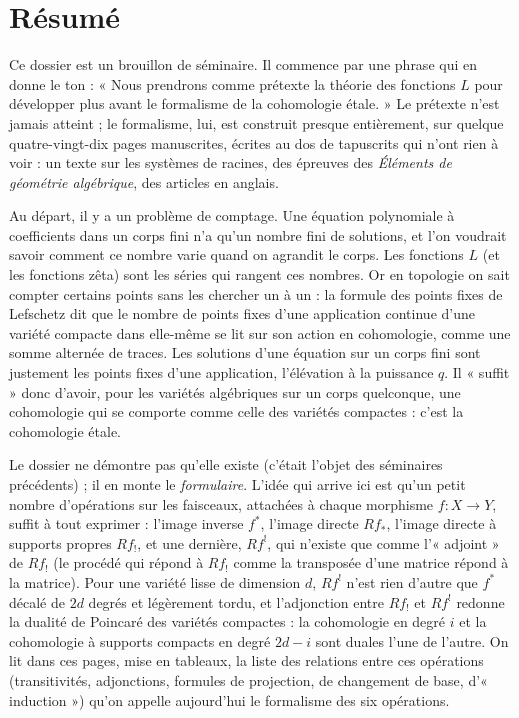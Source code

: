 \documentclass[11pt,a4paper]{article}
\begin{document}
\section*{Résumé}

\begin{resume}
Ce dossier est un brouillon de séminaire. Il commence par une phrase qui en
donne le ton : « Nous prendrons comme prétexte la théorie des fonctions $L$
pour développer plus avant le formalisme de la cohomologie étale. » Le
prétexte n'est jamais atteint ; le formalisme, lui, est construit presque
entièrement, sur quelque quatre-vingt-dix pages manuscrites, écrites au dos de
tapuscrits qui n'ont rien à voir : un texte sur les systèmes de racines, des épreuves des
\emph{Éléments de géométrie algébrique}, des articles en anglais.

Au départ, il y a un problème de comptage. Une équation polynomiale
à coefficients dans un corps fini n'a qu'un nombre fini de solutions, et l'on
voudrait savoir comment ce nombre varie quand on agrandit le corps. Les
fonctions $L$ (et les fonctions zêta) sont les séries qui rangent ces nombres.
Or en topologie on sait compter certains points sans les chercher un à un : la
formule des points fixes de Lefschetz dit que le nombre de points fixes d'une
application continue d'une variété compacte dans elle-même se lit sur son
action en cohomologie, comme une somme alternée de traces. Les solutions d'une
équation sur un corps fini sont justement les points fixes d'une application,
l'élévation à la puissance $q$. Il « suffit » donc d'avoir, pour les variétés
algébriques sur un corps quelconque, une cohomologie qui se comporte comme
celle des variétés compactes : c'est la cohomologie étale.

Le dossier ne démontre pas qu'elle existe (c'était l'objet des séminaires
précédents) ; il en monte le \emph{formulaire}. L'idée qui arrive ici est
qu'un petit nombre d'opérations sur les faisceaux, attachées à chaque morphisme
$f : X \to Y$, suffit à tout exprimer : l'image inverse $f^{*}$, l'image
directe $Rf_{*}$, l'image directe à supports propres $Rf_{!}$, et une dernière,
$Rf^{!}$, qui n'existe que comme l'« adjoint » de $Rf_{!}$ (le procédé qui
répond à $Rf_{!}$ comme la transposée d'une matrice répond à la matrice). Pour
une variété lisse de dimension $d$, $Rf^{!}$ n'est rien d'autre que $f^{*}$
décalé de $2d$ degrés et légèrement tordu, et l'adjonction entre $Rf_{!}$ et
$Rf^{!}$ redonne la dualité de Poincaré des variétés compactes : la cohomologie
en degré $i$ et la cohomologie à supports compacts en degré $2d-i$ sont duales
l'une de l'autre. On lit dans ces pages, mise en tableaux, la liste des
relations entre ces opérations (transitivités, adjonctions, formules de
projection, de changement de base, d'« induction ») qu'on appelle aujourd'hui
le formalisme des six opérations.


\end{resume}
\end{document}
